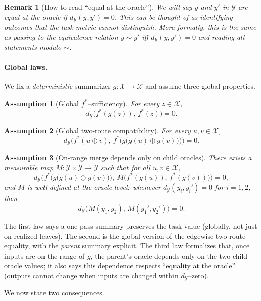 \documentclass[11pt]{article}
\newtheorem{assumption}{Assumption}
\newtheorem{remark}{Remark}
\newcommand{\Strings}{\mathcal{X}}       %
\newcommand{\Y}{\mathcal{Y}}               %
\newcommand{\fstar}{f^*}               %
\newcommand{\concat}{\oplus}                    %
\newcommand{\metric}{d_{\Y}}
\begin{document}
\begin{remark}[How to read ``equal at the oracle'']
We will say $y$ and $y'$ in $\Y$ are \emph{equal at the oracle} if $\metric(y,y')=0$. This can be thought of as identifying outcomes that the task metric cannot distinguish. More formally, this is the same as passing to the equivalence relation $y\sim y'$ iff $\metric(y,y')=0$ and reading all statements modulo $\sim$.
\end{remark}

\paragraph{Global laws.} We fix a \emph{deterministic} summarizer $g:\Strings\to\Strings$ and assume three global properties.

\begin{assumption}[Global $\fstar$–sufficiency]\label{ass:app1}
For every $z\in\Strings$,
\[
\metric\!\big(\fstar(g(z)),\,\fstar(z)\big)=0.
\]
\end{assumption}

\begin{assumption}[Global two-route compatibility]\label{ass:app2}
For every $u,v\in\Strings$,
\[
\metric\!\Big(\fstar(u\concat v),\ \fstar\!\big(g\big(g(u)\concat g(v)\big)\big)\Big)=0.
\]
\end{assumption}

\begin{assumption}[On-range merge depends only on child oracles]\label{ass:app3}
There exists a measurable map $M:\Y\times\Y\to\Y$ such that for all $u,v\in\Strings$,
\[
\metric\!\Big(\fstar\!\big(g\big(g(u)\concat g(v)\big)\big),\ M\big(\fstar(g(u)),\,\fstar(g(v))\big)\Big)=0,
\]
and $M$ is \emph{well-defined at the oracle level}: whenever $\metric(y_i,y_i')=0$ for $i=1,2$, then
\[
\metric\!\big(M(y_1,y_2),\,M(y_1',y_2')\big)=0.
\]
\end{assumption}

The first law says a one-pass summary preserves the task value (globally, not just on realized leaves). The second is the global version of the edgewise two-route equality, with the \emph{parent} summary explicit. The third law formalizes that, once inputs are on the range of $g$, the parent’s oracle depends only on the two child oracle values; it also says this dependence respects ``equality at the oracle'' (outputs cannot change when inputs are changed within $\metric$–zero).

\medskip

We now state two consequences. 
\end{document}

